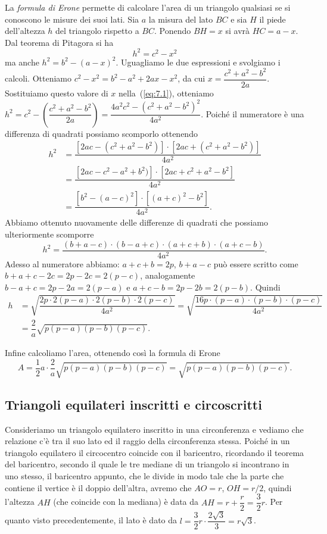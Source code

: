 La \emph{formula di Erone} permette di calcolare l'area di un triangolo qualsiasi se si conoscono le misure dei suoi lati.
Sia $a$ la misura del lato $BC$ e sia $H$ il piede dell'altezza $h$ del triangolo rispetto a $BC$. Ponendo $BH = x$ si avrà $HC = a - x$.
Dal teorema di Pitagora si ha
\begin{equation}\label{eq:7.1}
h^2=c^2-x^2
\end{equation}
ma anche $h^2=b^2-(a-x)^2$. Uguagliamo le due espressioni e svolgiamo i calcoli. Otteniamo $c^2-x^2=b^2-a^2+2ax-x^2$, da cui $x=\dfrac{c^2+a^2-b^2}{2a}$. Sostituiamo questo valore di $x$ nella~(\ref{eq:7.1}), otteniamo $h^2=c^2-\left(\dfrac{c^2+a^2-b^2}{2a}\right)=\dfrac{4a^2c^2-(c^2+a^2-b^2)^2}{4a^2}$.
Poiché il numeratore è una differenza di quadrati possiamo scomporlo ottenendo
\begin{align*}
h^2&=\dfrac{\left[2ac-(c^2+a^2-b^2)\right]\cdot\left[2ac+(c^2+a^2-b^2)\right]}{4a^2}\\
&=\dfrac{\left[2ac-c^2-a^2+b^2)\right]\cdot\left[2ac+c^2+a^2-b^2\right]}{4a^2}\\
&=\dfrac{\left[b^2-(a-c)^2\right]\cdot\left[(a+c)^2-b^2\right]}{4a^2}.
\end{align*}
Abbiamo ottenuto nuovamente delle differenze di quadrati che possiamo ulteriormente scomporre
\[h^2=\dfrac{(b+a-c)\cdot(b-a+c)\cdot(a+c+b)\cdot(a+c-b)}{4a^2}.\]
Adesso al numeratore abbiamo: $a + c + b = 2p$, $b + a - c$ può essere scritto come $b+a+c-2c = 2p-2c = 2(p-c)$, analogamente $b - a + c = 2p - 2a = 2 (p - a)$ e $a + c - b = 2p - 2b = 2(p - b)$.
Quindi
\begin{align*}
h&=\sqrt{\dfrac{2p\cdot 2(p-a) \cdot 2(p-b) \cdot 2(p-c)}{4a^2}}=\sqrt{\dfrac{16p\cdot (p-a) \cdot (p-b) \cdot (p-c)}{4a^2}}\\
&=\dfrac{2}{a}\sqrt{p(p-a)(p-b)(p-c)}.
\end{align*}

Infine calcoliamo l'area, ottenendo così la formula di Erone
\[A=\dfrac{1}{2}a\cdot\dfrac{2}{a}\sqrt{p(p-a)(p-b)(p-c)}=\sqrt{p(p-a)(p-b)(p-c)}.\]

\subsection{Triangoli equilateri inscritti e circoscritti}

Consideriamo un triangolo equilatero inscritto in una circonferenza e vediamo che relazione c'è tra il suo lato ed il raggio della circonferenza stessa.
Poiché in un triangolo equilatero il circocentro coincide con il baricentro, ricordando il teorema del baricentro, secondo il quale le tre mediane di un triangolo si incontrano in uno stesso, il baricentro appunto, che le divide in modo tale che la parte che contiene il vertice è il doppio dell'altra, avremo che $AO = r$, $OH = r/2$, quindi l'altezza $AH$ (che coincide con la mediana) è data da $AH = r+\dfrac{r}{2}=\dfrac{3}{2}r$.
Per quanto visto precedentemente, il lato è dato da $l=\dfrac{3}{2}r\cdot\dfrac{2\sqrt{3}}{3}=r\sqrt{3}$. 


